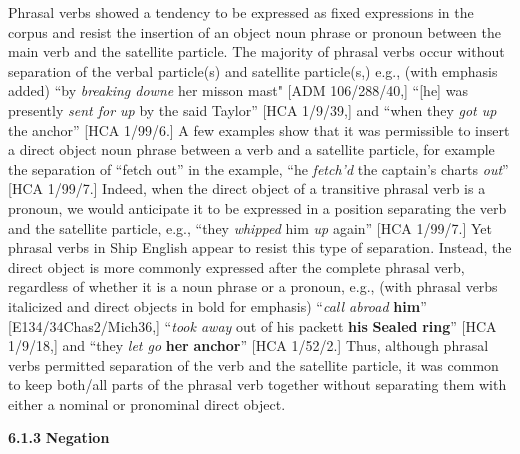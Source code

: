   Phrasal verbs showed a tendency to be expressed as fixed expressions in the corpus and resist the insertion of an object noun phrase or pronoun between the main verb and the satellite particle. The majority of phrasal verbs occur without separation of the verbal particle(s) and satellite particle(s,) e.g., (with emphasis added) “by \textit{breaking downe} her misson mast" [ADM 106/288/40,] “[he] was presently \textit{sent for up} by the said Taylor” [HCA 1/9/39,] and “when they \textit{got up} the anchor” [HCA 1/99/6.] A few examples show that it was permissible to insert a direct object noun phrase between a verb and a satellite particle, for example the separation of “fetch out” in the example, “he \textit{fetch’d} the captain’s charts \textit{out}” [HCA 1/99/7.] Indeed, when the direct object of a transitive phrasal verb is a pronoun, we would anticipate it to be expressed in a position separating the verb and the satellite particle, e.g., “they \textit{whipped} him \textit{up} again” [HCA 1/99/7.] Yet phrasal verbs in Ship English appear to resist this type of separation. Instead, the direct object is more commonly expressed after the complete phrasal verb, regardless of whether it is a noun phrase or a pronoun, e.g., (with phrasal verbs italicized and direct objects in bold for emphasis) “\textit{call abroad} \textbf{him}” [E134/34Chas2/Mich36,] “\textit{took away} out of his packett \textbf{his} \textbf{Sealed} \textbf{ring}” [HCA 1/9/18,] and “they \textit{let go} \textbf{her} \textbf{anchor}” [HCA 1/52/2.] Thus, although phrasal verbs permitted separation of the verb and the satellite particle, it was common to keep both/all parts of the phrasal verb together without separating them with either a nominal or pronominal direct object. 

  \textbf{6.1.3} \textbf{Negation}

